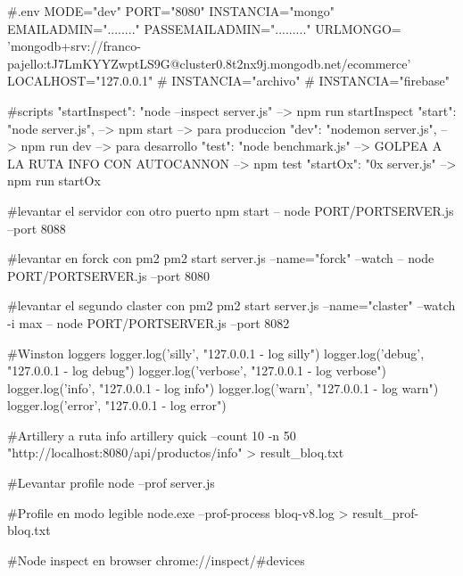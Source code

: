 #.env
    MODE="dev"  
    PORT="8080"
    INSTANCIA="mongo"  
    EMAILADMIN="........"
    PASSEMAILADMIN="........."
    URLMONGO= 'mongodb+srv://franco-pajello:tJ7LmKYYZwptLS9G@cluster0.8t2nx9j.mongodb.net/ecommerce'
    LOCALHOST="127.0.0.1"
    #  INSTANCIA="archivo"      
    #  INSTANCIA="firebase"

#scripts
    "startInspect": "node --inspect server.js"    --> npm run startInspect
    "start": "node server.js",                    --> npm start -->  para produccion
    "dev": "nodemon server.js",                   --> npm run dev --> para desarrollo
    "test": "node benchmark.js"                   --> GOLPEA A LA RUTA INFO CON AUTOCANNON --> npm test
    "startOx": "0x server.js"                     --> npm run startOx

#levantar el servidor con otro puerto
    npm start -- node PORT/PORTSERVER.js --port 8088

#levantar en forck con pm2 
    pm2 start server.js --name="forck" --watch -- node PORT/PORTSERVER.js --port 8080

#levantar el segundo claster con pm2 
    pm2 start server.js --name="claster" --watch -i max -- node PORT/PORTSERVER.js --port 8082

#Winston loggers
    logger.log('silly', "127.0.0.1 - log silly")
    logger.log('debug', "127.0.0.1 - log debug")
    logger.log('verbose', "127.0.0.1 - log verbose")
    logger.log('info', "127.0.0.1 - log info")
    logger.log('warn', "127.0.0.1 - log warn")
    logger.log('error', "127.0.0.1 - log error")

#Artillery a ruta info
    artillery quick --count 10 -n 50 "http://localhost:8080/api/productos/info" > result_bloq.txt

#Levantar profile
    node --prof server.js

#Profile en modo legible
    node.exe --prof-process bloq-v8.log > result_prof-bloq.txt

#Node inspect en browser
    chrome://inspect/#devices

